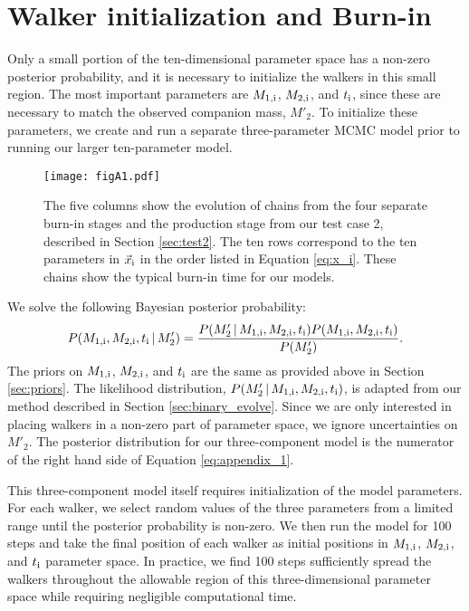 \documentclass[usenatbib]{mnras}
\newcommand{\given}{\,|\,}
\begin{document}




\appendix

\section{Walker initialization and Burn-in} \label{sec:initialize}

Only a small portion of the ten-dimensional parameter space has a non-zero posterior probability, and it is necessary to initialize the walkers in this small region. The most important parameters are $M_{\rm 1,i}$, $M_{\rm 2,i}$, and $t_{\rm i}$, since these are necessary to match the observed companion mass, $M'_2$. To initialize these parameters, we create and run a separate three-parameter MCMC model prior to running our larger ten-parameter model. 


\begin{figure*}
\begin{center}
\texttt{[image: figA1.pdf]}
\caption{The five columns show the evolution of chains from the four separate burn-in stages and the production stage from our test case 2, described in Section \ref{sec:test2}. The ten rows correspond to the ten parameters in $\vec{x}_{\rm i}$ in the order listed in Equation \ref{eq:x_i}. These chains show the typical burn-in time for our models. }
\label{fig:burn-in_test2}
\end{center}
\end{figure*}


We solve the following Bayesian posterior probability:
\begin{equation}
P(M_{\rm 1,i}, M_{\rm 2,i}, t_{\rm i} \given M'_2) = \frac{ P(M'_2 \given M_{\rm 1,i}, M_{\rm 2,i}, t_{\rm i} ) P( M_{\rm 1,i}, M_{\rm 2,i}, t_{\rm i} )}{P(M'_2)}. \label{eq:appendix_1}
\end{equation}
The priors on $M_{\rm 1,i}$, $M_{\rm 2,i}$, and $t_{\rm i}$ are the same as provided above in Section \ref{sec:priors}. The likelihood distribution, $P(M'_2 \given M_{\rm 1,i}, M_{\rm 2,i}, t_{\rm i} )$, is adapted from our method described in Section \ref{sec:binary_evolve}. Since we are only interested in placing walkers in a non-zero part of parameter space, we ignore uncertainties on $M'_2$. The posterior distribution for our three-component model is the numerator of the right hand side of Equation \ref{eq:appendix_1}. 


This three-component model itself requires initialization of the model parameters. For each walker, we select random values of the three parameters from a limited range until the posterior probability is non-zero. We then run the model for 100 steps and take the final position of each walker as initial positions in $M_{\rm 1,i}$, $M_{\rm 2,i}$, and $t_{\rm i}$ parameter space. In practice, we find 100 steps sufficiently spread the walkers throughout the allowable region of this three-dimensional parameter space while requiring negligible computational time.
\end{document}
